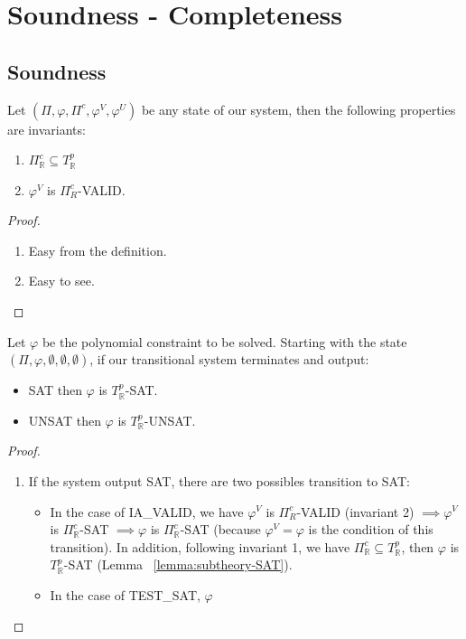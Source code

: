 \section{Soundness - Completeness}
\subsection{Soundness}
\begin{theorem}
Let $(\Pi, \varphi, \Pi^c, \varphi^V, \varphi^U)$ be any state of our system, then the following properties are invariants:
\begin{enumerate}
\item $\Pi^c_\mathbb{R} \subseteq T^p_\mathbb{R}$
\item $\varphi^V$ is $\Pi^c_{R}$-VALID.
\end{enumerate}
\end{theorem}

\begin{proof}
\begin{enumerate}
\item Easy from the definition.
\item Easy to see.
\end{enumerate}
\end{proof}

\begin{theorem}
Let $\varphi$ be the polynomial constraint to be solved. Starting with the state $(\Pi, \varphi, \emptyset, \emptyset, \emptyset)$, if our transitional system terminates and output:
\begin{itemize}
\item SAT then $\varphi$ is $T^p_\mathbb{R}$-SAT.
\item UNSAT then $\varphi$ is $T^p_\mathbb{R}$-UNSAT.
\end{itemize}
\end{theorem}

\begin{proof}
\begin{enumerate}
\item If the system output SAT, there are two possibles transition to SAT:
\begin{itemize}
\item In the case of IA\_VALID, we have $\varphi^V$ is $\Pi^c_{R}$-VALID (invariant 2) $\implies \varphi^V$ is $\Pi^c_\mathbb{R}$-SAT $\implies \varphi$ is $\Pi^c_\mathbb{R}$-SAT (because $\varphi^V = \varphi$ is the condition of this transition). In addition, following invariant 1, we have $\Pi^c_\mathbb{R} \subseteq T^p_\mathbb{R}$, then $\varphi$ is $T^p_\mathbb{R}$-SAT (Lemma ~\ref{lemma:subtheory-SAT}).
\item In the case of TEST\_SAT, $\varphi$
\end{itemize}
\end{enumerate}
\end{proof}

